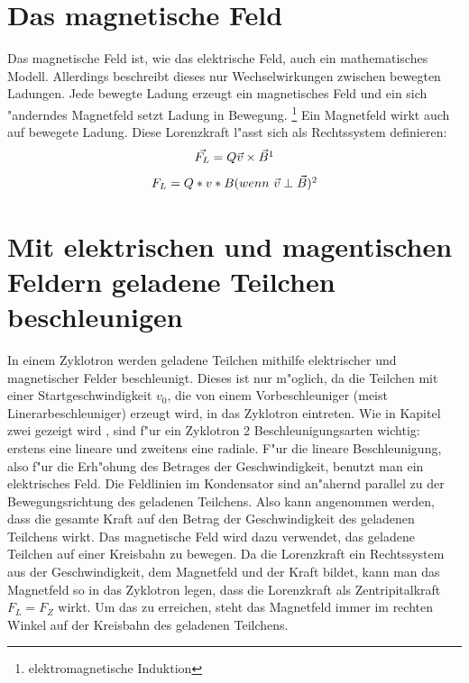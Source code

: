 \documentclass[14pt, a4paper]{report}
\begin{document}
\section{Das magnetische Feld}
Das magnetische Feld ist, wie das elektrische Feld, auch ein mathematisches Modell.
Allerdings beschreibt dieses nur Wechselwirkungen zwischen bewegten Ladungen. Jede
bewegte Ladung erzeugt ein magnetisches Feld und ein sich "anderndes Magnetfeld 
setzt Ladung in Bewegung. \footnote{elektromagnetische Induktion}
Ein Magnetfeld wirkt auch auf bewegete Ladung. Diese Lorenzkraft l"asst sich als
Rechtssystem definieren:
\newpage
\begin{equation} \label{B-Feld-Gleichungen}
 \vec{F_L} = Q\vec{v} \times \vec{B} \footnotemark
\end{equation}
\begin{equation}
 F_L  = Q * v * B (wenn ~ \vec{v} \perp \vec{B}) \footnotemark
\end{equation}

 
\section{Mit elektrischen und magentischen Feldern geladene Teilchen beschleunigen}
In einem Zyklotron werden geladene Teilchen mithilfe elektrischer und magnetischer 
Felder beschleunigt. Dieses ist nur m"oglich, da die Teilchen mit einer
Startgeschwindigkeit $v_0$, die von einem Vorbeschleuniger (meist 
Linerarbeschleuniger) erzeugt wird, in das Zyklotron eintreten. Wie in Kapitel zwei
gezeigt wird 
,
sind f"ur ein Zyklotron 2 Beschleunigungsarten wichtig: erstens eine lineare und 
zweitens eine radiale. F"ur die lineare Beschleunigung, also f"ur die Erh"ohung des 
Betrages der Geschwindigkeit, benutzt man ein elektrisches Feld. Die Feldlinien im 
Kondensator sind an"ahernd parallel zu der Bewegungsrichtung des geladenen Teilchens. 
Also kann angenommen werden, dass die gesamte Kraft auf den Betrag der Geschwindigkeit 
des geladenen Teilchens wirkt. Das magnetische Feld wird dazu verwendet, das geladene
Teilchen auf einer Kreisbahn zu bewegen. Da die Lorenzkraft ein Rechtssystem aus der
Geschwindigkeit, dem Magnetfeld und der Kraft bildet, kann man das Magnetfeld so
in das Zyklotron legen, dass die Lorenzkraft als Zentripitalkraft $F_L = F_Z$ wirkt.
Um das zu erreichen, steht das Magnetfeld immer im rechten Winkel auf der Kreisbahn
des geladenen Teilchens.
\end{document}
